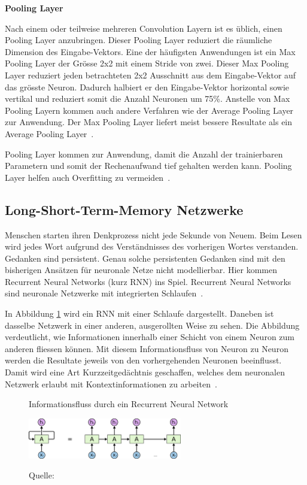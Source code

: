 \textbf{Pooling Layer}

\nopagebreak

Nach einem oder teilweise mehreren Convolution Layern ist es üblich, einen Pooling Layer anzubringen. Dieser Pooling Layer reduziert die räumliche Dimension des Eingabe-Vektors. Eine der häufigsten Anwendungen ist ein Max Pooling Layer der Grösse 2x2 mit einem Stride von zwei. Dieser Max Pooling Layer reduziert jeden betrachteten 2x2 Ausschnitt aus dem Eingabe-Vektor auf das grösste Neuron. Dadurch halbiert er den Eingabe-Vektor horizontal sowie vertikal und reduziert somit die Anzahl Neuronen um 75\%. Anstelle von Max Pooling Layern kommen auch andere Verfahren wie der Average Pooling Layer zur Anwendung. Der Max Pooling Layer liefert meist bessere Resultate als ein Average Pooling Layer~\autocite{CNN}.

Pooling Layer kommen zur Anwendung, damit die Anzahl der trainierbaren Parametern und somit der Rechenaufwand tief gehalten werden kann. Pooling Layer helfen auch Overfitting zu vermeiden~\autocite{CNN}.

\subsection{Long-Short-Term-Memory Netzwerke}

Menschen starten ihren Denkprozess nicht jede Sekunde von Neuem. Beim Lesen wird jedes Wort aufgrund des Verständnisses des vorherigen Wortes verstanden. Gedanken sind persistent. Genau solche persistenten Gedanken sind mit den bisherigen Ansätzen für neuronale Netze nicht modellierbar. Hier kommen Recurrent Neural Networks (kurz RNN) ins Spiel. Recurrent Neural Networks sind neuronale Netzwerke mit integrierten Schlaufen~\autocite{Olah2015}. 

In Abbildung \ref{rnn1} wird ein RNN mit einer Schlaufe dargestellt. Daneben ist dasselbe Netzwerk in einer anderen, ausgerollten Weise zu sehen. Die Abbildung verdeutlicht, wie Informationen innerhalb einer Schicht von einem Neuron zum anderen fliessen können. Mit diesem Informationsfluss von Neuron zu Neuron werden die Resultate jeweils von den vorhergehenden Neuronen beeinflusst. Damit wird eine Art Kurzzeitgedächtnis geschaffen, welches dem neuronalen Netzwerk erlaubt mit Kontextinformationen zu arbeiten~\autocite{Olah2015}.
\begin{figure}[h!]
    \captionsetup{width=.9\linewidth}
    \caption{Informationsfluss durch ein Recurrent Neural Network}
    \label{rnn1}
    \centering
    \vspace{0.2cm}
    \includegraphics[width=0.6\textwidth]{graphics/rnn1.png}\\
    \vspace{0.3cm}
    \caption*{Quelle: \textcite{Olah2015}}
\end{figure}

